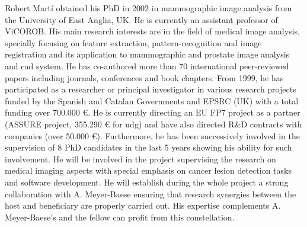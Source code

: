 Robert Mart\'i obtained his PhD in 2002 in mammographic image analysis from the University of East Anglia, UK. He is currently an assistant professor of ViCOROB. His main research interests are in the field of medical image analysis, specially focusing on feature extraction, pattern-recognition and image registration and its application to mammographic and prostate image analysis and \ac{cad} system. He has co-authored more than 70 international peer-reviewed papers including journals, conferences and book chapters. From 1999, he has participated as a researcher or principal investigator in various research projects funded by the Spanish and Catalan Governments and EPSRC (UK) with a total funding over 700.000 \euro{}. He is currently directing an EU FP7 project as a partner (ASSURE project, 355.290 \euro{} for \ac{udg}) and have also directed R\&D contracts with companies (over 50.000 \euro{}).
Furthermore, he has been successively involved in the supervision of 8 PhD candidates in the last 5 years showing his ability for such involvement.
He will be involved in the project supervising the research on medical imaging aspects with special emphasis on cancer lesion detection tasks and software development.
He will establish during the whole project a strong collaboration with A. Meyer-Baese ensuring that research synergies between the host and beneficiary are properly carried out. 
His expertise complements A. Meyer-Baese's and the fellow can profit from this constellation.





